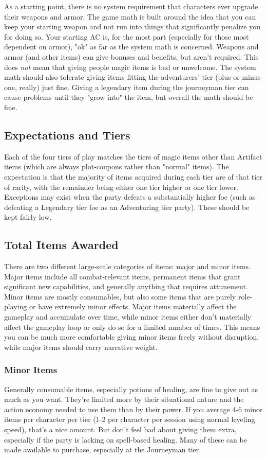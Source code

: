 \documentclass[10pt,twoside,openany,bg=none]{dndbook}
\begin{document}
As a starting point, there is no system requirement that characters ever upgrade their weapons and armor. The game math is built around the idea that you can keep your starting weapon and not run into things that significantly penalize you for doing so. Your starting AC is, for the most part (especially for those most dependent on armor), "ok" as far as the system math is concerned. Weapons and armor (and other items) can give bonuses and benefits, but aren't required. This does \textit{not} mean that giving people magic items is bad or unwelcome. The system math should also tolerate giving items fitting the adventurers' tier (plus or minus one, really) just fine. Giving a legendary item during the journeyman tier can cause problems until they "grow into" the item, but overall the math should be fine.

\subsection{Expectations and Tiers}
Each of the four tiers of play matches the tiers of magic items other than Artifact items (which are always plot-coupons rather than "normal" items). The expectation is that the majority of items acquired during each tier are of that tier of rarity, with the remainder being either one tier higher or one tier lower. Exceptions may exist when the party defeats a substantially higher foe (such as defeating a Legendary tier foe as an Adventuring tier party). These should be kept fairly low.

\subsection{Total Items Awarded}
There are two different large-scale categories of items: major and minor items. Major items include all combat-relevant items, permanent items that grant significant new capabilities, and generally anything that requires attunement. Minor items are mostly consumables, but also some items that are purely role-playing or have extremely minor effects. Major items materially affect the gameplay and accumulate over time, while minor items either don't materially affect the gameplay loop or only do so for a limited number of times. This means you can be much more comfortable giving minor items freely without disruption, while major items should carry narrative weight.

\subsubsection{Minor Items}
Generally consumable items, especially potions of healing, are fine to give out as much as you want. They're limited more by their situational nature and the action economy needed to use them than by their power. If you average 4-6 minor items per character per tier (1-2 per character per session using normal leveling speed), that's a nice amount. But don't feel bad about giving them extra, especially if the party is lacking on spell-based healing. Many of these can be made available to purchase, especially at the Journeyman tier.
\end{document}
